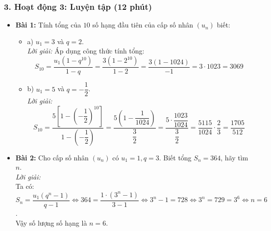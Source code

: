 \documentclass[12pt, a4paper]{article}
\begin{document}
\subsubsection*{3. Hoạt động 3: Luyện tập (12 phút)}
\begin{itemize}
    \item \textbf{Bài 1:} Tính tổng của $10$ số hạng đầu tiên của cấp số nhân $(u_n)$ biết:
    \begin{itemize}
        \item a) $u_1 = 3$ và $q = 2$.\\
        \textit{Lời giải:} Áp dụng công thức tính tổng:
        $$S_{10} = \dfrac{u_1(1 - q^{10})}{1 - q} = \dfrac{3(1 - 2^{10})}{1 - 2} = \dfrac{3(1 - 1024)}{-1} = 3 \cdot 1023 = 3069$$
        \item b) $u_1 = 5$ và $q = -\dfrac{1}{2}$.\\
        \textit{Lời giải:}\\
        $$S_{10} = \dfrac{5\left[1 - \left(-\dfrac{1}{2}\right)^{10}\right]}{1 - \left(-\dfrac{1}{2}\right)} = \dfrac{5\left(1 - \dfrac{1}{1024}\right)}{\dfrac{3}{2}} = \dfrac{5 \cdot \dfrac{1023}{1024}}{\dfrac{3}{2}} = \dfrac{5115}{1024} \cdot \dfrac{2}{3} = \dfrac{1705}{512}$$
    \end{itemize}
    \item \textbf{Bài 2:} Cho cấp số nhân $(u_n)$ có $u_1 = 1, q = 3$. Biết tổng $S_n = 364$, hãy tìm $n$.\\
    \textit{Lời giải:}\\
    Ta có: $S_n = \dfrac{u_1(q^n - 1)}{q - 1} \iff 364 = \dfrac{1 \cdot (3^n - 1)}{3 - 1} \iff 3^n - 1 = 728 \iff 3^n = 729 = 3^6 \iff n = 6$.\\
    Vậy số lượng số hạng là $n = 6$.
\end{itemize}
\end{document}
